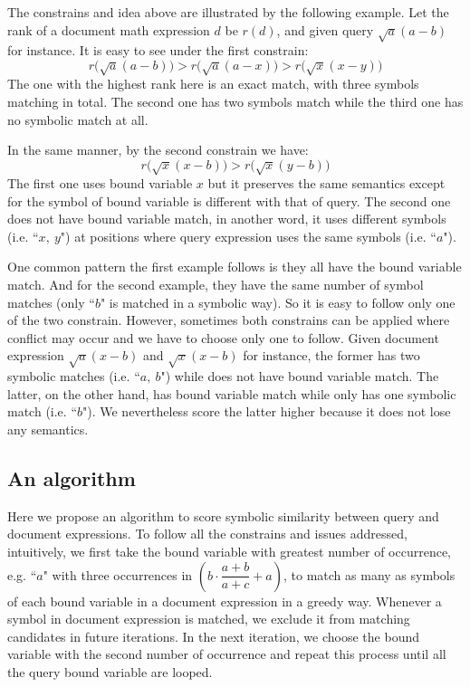 The constrains and idea above are illustrated by the following example. 
Let the rank of a document math expression $d$ be $r(d)$, and given query $\sqrt a (a - b)$ for instance. 
It is easy to see under the first constrain: 
$$
r\big(\sqrt a (a - b)\big) > r\big(\sqrt a (a - x)\big) > r\big(\sqrt x (x - y)\big)
$$
The one with the highest rank here is an exact match, with three symbols matching in total. 
The second one has two symbols match while the third one has no symbolic match at all. 

In the same manner, by the second constrain we have:
$$
r\big(\sqrt x (x - b)\big) > r\big(\sqrt x (y - b)\big)
$$
The first one uses bound variable $x$ but it preserves the same semantics except for the symbol of bound variable is different with that of query.
The second one does not have bound variable match, in another word, it uses different symbols (i.e. ``$x,\ y$") at positions where query expression uses the same symbols (i.e. ``$a$").

One common pattern the first example follows is they all have the bound variable match. 
And for the second example, they have the same number of symbol matches (only ``$b$" is matched in a symbolic way). 
So it is easy to follow only one of the two constrain. 
However, sometimes both constrains can be applied where conflict may occur and we have to choose only one to follow. 
Given document expression $\sqrt a (x - b)$ and $\sqrt x (x - b)$ for instance, the former has two symbolic matches (i.e. ``$a,\ b$") while does not have bound variable match. The latter, on the other hand, has bound variable match while only has one symbolic match (i.e. ``$b$"). We nevertheless score the latter higher because it does not lose any semantics. 

\subsection{An algorithm}
Here we propose an algorithm to score symbolic similarity between query and document expressions.
To follow all the constrains and issues addressed, intuitively, we first take the bound variable with greatest number of occurrence, e.g. ``$a$" with three occurrences in $\left(b \cdot \dfrac{a+b}{a+c} + a\right)$, to match as many as symbols of each bound variable in a document expression in a greedy way. 
Whenever a symbol in document expression is matched, we exclude it from matching candidates in future iterations.
In the next iteration, we choose the bound variable with the second number of occurrence and repeat this process until all the query bound variable are looped.

